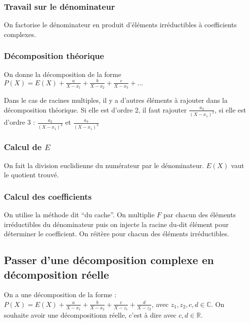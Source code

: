 \documentclass[french]{yLectureNote}
\begin{document}
\subsubsection{Travail sur le dénominateur}
On factorise le dénominateur en produit d'éléments irréductibles à coefficients complexes.
\subsubsection{Décomposition théorique}
On donne la décomposition de la forme $P(X) = E(X) + \frac{a}{X-x_1} + \frac{b}{X-x_2} + \frac{c}{X-x_3} + \dots$

Dans le cas de racines multiples, il y a d'autres éléments à rajouter dans la décomposition théorique. Si elle est d'ordre 2, il faut rajouter $\frac{a_2}{(X-x_1)^2}$, si elle est d'ordre 3 : $\frac{a_2}{(X-x_1)^2}$ et $\frac{a_3}{(X-x_1)^3}$
\subsubsection{Calcul de $E$}
On fait la division euclidienne du numérateur par le dénominateur. $E(X)$ vaut le quotient trouvé.
\subsubsection{Calcul des coefficients}
On utilise la méthode dit ``du cache''. On multiplie $F$ par chacun des éléments irréductibles du dénominateur puis on injecte la racine du-dit élément pour déterminer le coefficient. On réitère pour chacun des éléments irréductibles.

\subsection{Passer d'une décomposition complexe en décomposition réelle}
On a une décomposition de la forme : $P(X) = E(X) + \frac{a}{X-x_1}+\frac{b}{X-x_2} +\frac{c}{X-z_1} + \frac{d}{X-z_2}$, avec $z_1,z_2,c,d\in\mathbb{C}$. On souhaite avoir une décompositionn réelle, c'est à dire avec $c,d\in\mathbb{R}$.
\end{document}

